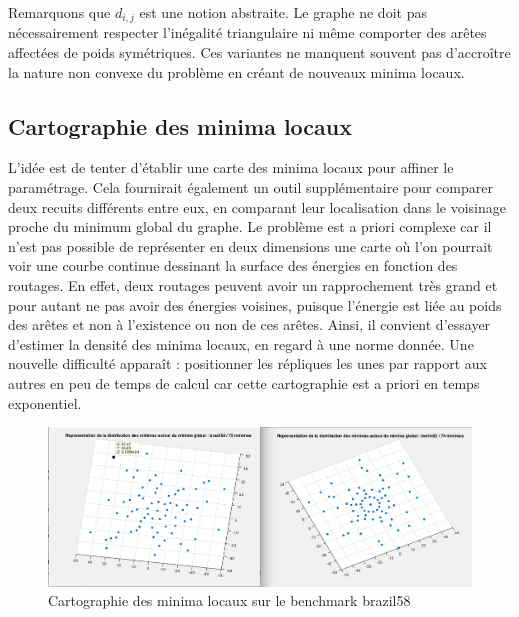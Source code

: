 \documentclass{article}%
\begin{document}
Remarquons que $ d_{i,j} $ est une notion abstraite. Le graphe ne doit pas nécessairement respecter l'inégalité triangulaire ni même comporter des arêtes affectées de poids symétriques. Ces variantes ne manquent souvent pas d'accroître la nature non convexe du problème en créant de nouveaux minima locaux.

\subsection{Cartographie des minima locaux}

L’idée est de tenter d’établir une carte des minima locaux pour affiner le paramétrage. Cela fournirait également un outil supplémentaire pour comparer deux recuits différents entre eux, en comparant leur localisation dans le voisinage proche du minimum global du graphe.
Le problème est a priori complexe car il n’est pas possible de représenter en deux dimensions une carte où l’on pourrait voir une courbe continue dessinant la surface des énergies en fonction des routages. En effet, deux routages peuvent avoir un rapprochement très grand et pour autant ne pas avoir des énergies voisines, puisque l’énergie est liée au poids des arêtes et non à l’existence ou non de ces arêtes.
Ainsi, il convient d’essayer d’estimer la densité des minima locaux, en regard à une norme donnée. 
Une nouvelle difficulté apparaît : positionner les répliques les unes par rapport aux autres en peu de temps de calcul car cette cartographie est a priori en temps exponentiel. 



\begin{figure}[h]
\begin{center}
\includegraphics[scale=0.3]{cartes.png} 
\caption{Cartographie des minima locaux sur le benchmark brazil58}
\end{center}
\end{figure}
\end{document}
